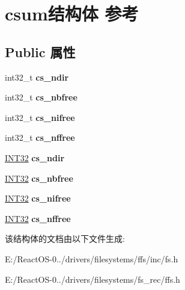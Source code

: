 \hypertarget{structcsum}{}\section{csum结构体 参考}
\label{structcsum}
\subsection*{Public 属性}
\begin{DoxyCompactItemize}
\item 
\mbox{\label{structcsum_a910936b597b99baa5f64ddd5a15f6b70}} 
int32\+\_\+t {\bfseries cs\+\_\+ndir}
\item 
\mbox{\label{structcsum_ac77b40fc2a8d65ec266e9471fb96ed99}} 
int32\+\_\+t {\bfseries cs\+\_\+nbfree}
\item 
\mbox{\label{structcsum_a997edf4fbc43862abb72a4a7e411a51d}} 
int32\+\_\+t {\bfseries cs\+\_\+nifree}
\item 
\mbox{\label{structcsum_a4725bcc5b848a377eb7aeb181018405d}} 
int32\+\_\+t {\bfseries cs\+\_\+nffree}
\item 
\mbox{\label{structcsum_a97666c51b54e69d14530729ec0a375d5}} 
\hyperlink{_processor_bind_8h_a1137216524060afd426c34677fed058b}{I\+N\+T32} {\bfseries cs\+\_\+ndir}
\item 
\mbox{\label{structcsum_a7e552ad47b4bcc735b4d344ba9281562}} 
\hyperlink{_processor_bind_8h_a1137216524060afd426c34677fed058b}{I\+N\+T32} {\bfseries cs\+\_\+nbfree}
\item 
\mbox{\label{structcsum_a030a647a5fe6526bed4cdfda4062ed8b}} 
\hyperlink{_processor_bind_8h_a1137216524060afd426c34677fed058b}{I\+N\+T32} {\bfseries cs\+\_\+nifree}
\item 
\mbox{\label{structcsum_ad5ded676447af0c1e9f119cb2138448a}} 
\hyperlink{_processor_bind_8h_a1137216524060afd426c34677fed058b}{I\+N\+T32} {\bfseries cs\+\_\+nffree}
\end{DoxyCompactItemize}


该结构体的文档由以下文件生成\+:\begin{DoxyCompactItemize}
\item 
E\+:/\+React\+O\+S-\/0../drivers/filesystems/ffs/inc/fs.\+h\item 
E\+:/\+React\+O\+S-\/0../drivers/filesystems/fs\+\_\+rec/ffs.\+h\end{DoxyCompactItemize}
